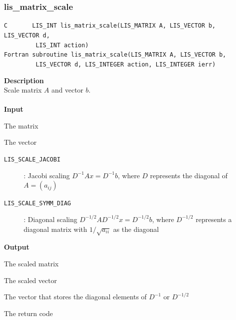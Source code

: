\documentclass[a4paper]{article}
\newcommand{\namelistlabel}[1]{\mbox{#1}\hfill}
\newenvironment{namelist}[1]{%
\begin{list}{}
  {\let\makelabel\namelistlabel
  \settowidth{\labelwidth}{#1}
  \setlength{\leftmargin}{1.1\labelwidth}}
  }{%
\end{list}}
\begin{document}
\newpage
\subsubsection{lis\_matrix\_scale}
\begin{screen}
\verb|C       LIS_INT lis_matrix_scale(LIS_MATRIX A, LIS_VECTOR b, LIS_VECTOR d,|\\
\verb|         LIS_INT action)|\\
\verb|Fortran subroutine lis_matrix_scale(LIS_MATRIX A, LIS_VECTOR b,|\\
\verb|         LIS_VECTOR d, LIS_INTEGER action, LIS_INTEGER ierr)|
\end{screen}
{\bf Description}\\
\indent
Scale matrix $A$ and vector $b$.
\\ \\
\noindent
{\bf Input}
\begin{namelist}{XXXXXXXXXXXXXXXXXXXX}
\item[\tt A] The matrix
\item[\tt b] The vector
\item[\tt action] \begin{description}
\item[\tt LIS\_SCALE\_JACOBI]: Jacobi scaling $D^{-1}Ax=D^{-1}b$, where $D$
	   represents the diagonal of $A=(a_{ij})$
\item[\tt LIS\_SCALE\_SYMM\_DIAG]: Diagonal scaling
	   $D^{-1/2}AD^{-1/2}x=D^{-1/2}b$, where $D^{-1/2}$ represents
	   a diagonal matrix with $1/\sqrt{a_{ii}}$ as the diagonal
\end{description}
\end{namelist}
{\bf Output}
\begin{namelist}{XXXXXXXXXXXXXXXXXXXX}
\item[\tt A] The scaled matrix
\item[\tt b] The scaled vector
\item[\tt d]  The vector that stores the diagonal elements of $D^{-1}$ or $D^{-1/2}$
\item[\tt ierr] The return code
\end{namelist}
\end{document}
